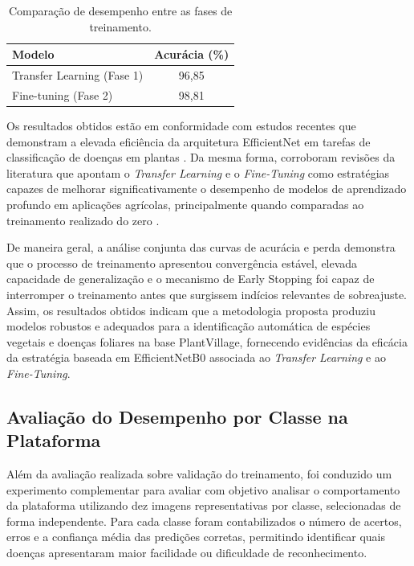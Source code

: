 \documentclass[portuguese]{sbc2025}%
\begin{document}
\begin{table}[ht]
\centering
\caption{Comparação de desempenho entre as fases de treinamento.}
\renewcommand{\arraystretch}{1.2}
\setlength{\tabcolsep}{10pt}
{\normalsize
\begin{tabular}{lc}
\hline
Modelo & Acurácia (\%) \\
\hline
Transfer Learning (Fase 1) & 96,85 \\
Fine-tuning (Fase 2) & 98,81 \\
\hline
\end{tabular}
}
\label{tab:comparacao_fases}
\end{table}

Os resultados obtidos estão em conformidade com estudos recentes que demonstram a elevada eficiência da arquitetura EfficientNet em 
tarefas de classificação de doenças em plantas \cite{ref4}. Da mesma forma, corroboram revisões da literatura que apontam o 
\textit{Transfer Learning} e o \textit{Fine-Tuning} como estratégias capazes de melhorar significativamente o desempenho de modelos 
de aprendizado profundo em aplicações agrícolas, principalmente quando comparadas ao treinamento realizado do zero 
\cite{ref2,ref21}.

De maneira geral, a análise conjunta das curvas de acurácia e perda demonstra que o processo de treinamento apresentou convergência 
estável, elevada capacidade de generalização e o mecanismo de Early Stopping foi capaz de interromper o treinamento antes que 
surgissem indícios relevantes de sobreajuste. Assim, os resultados obtidos indicam que a metodologia proposta produziu modelos 
robustos e adequados para a identificação automática de espécies vegetais e doenças foliares na base PlantVillage, fornecendo 
evidências da eficácia da estratégia baseada em EfficientNetB0 associada ao \textit{Transfer Learning} e ao \textit{Fine-Tuning}.

\subsection{Avaliação do Desempenho por Classe na Plataforma}
Além da avaliação realizada sobre validação do treinamento, foi conduzido um experimento complementar para avaliar com objetivo 
analisar o comportamento da plataforma utilizando dez imagens representativas por classe, selecionadas de forma independente. 
Para cada classe foram contabilizados o número de acertos, erros e a confiança média das predições corretas, permitindo identificar
quais doenças apresentaram maior facilidade ou dificuldade de reconhecimento.
\end{document}
